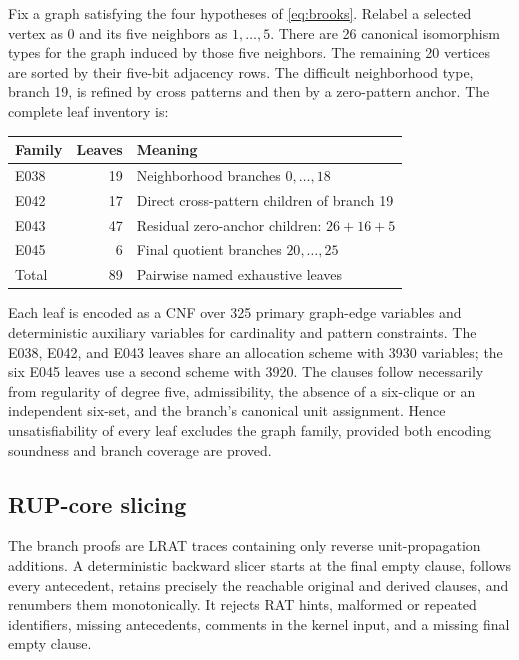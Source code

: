 \documentclass[11pt,reqno,a4paper]{amsart}
\theoremstyle{definition}
\theoremstyle{remark}
\begin{document}
Fix a graph satisfying the four hypotheses of
\eqref{eq:brooks}.  Relabel a selected vertex as 0 and its five neighbors as
\(1,\ldots,5\).  There are 26 canonical isomorphism types for the graph
induced by those five neighbors.  The remaining 20 vertices are sorted by
their five-bit adjacency rows.  The difficult neighborhood type, branch 19,
is refined by cross patterns and then by a zero-pattern anchor.  The
complete leaf inventory is:
\begin{center}
\begin{tabular}{@{}lrl@{}}
\toprule
Family & Leaves & Meaning\\
\midrule
E038 & 19 & Neighborhood branches \(0,\ldots,18\)\\
E042 & 17 & Direct cross-pattern children of branch 19\\
E043 & 47 & Residual zero-anchor children: \(26+16+5\)\\
E045 & 6 & Final quotient branches \(20,\ldots,25\)\\
\midrule
Total & 89 & Pairwise named exhaustive leaves\\
\bottomrule
\end{tabular}
\end{center}

Each leaf is encoded as a CNF over 325 primary graph-edge variables and
deterministic auxiliary variables for cardinality and pattern constraints.
The E038, E042, and E043 leaves share an allocation scheme with 3930
variables; the six E045 leaves use a second scheme with 3920.  The
clauses follow necessarily from regularity of degree five, admissibility,
the absence of a six-clique or an independent six-set, and the branch's
canonical unit assignment.  Hence unsatisfiability of every leaf excludes the
graph family, provided both encoding soundness and branch coverage are proved.

\subsection{RUP-core slicing}

The branch proofs are LRAT traces containing only reverse unit-propagation
additions.  A deterministic backward slicer starts at the final
empty clause, follows every antecedent, retains precisely the reachable
original and derived clauses, and renumbers them monotonically.  It rejects
RAT hints, malformed or repeated identifiers, missing antecedents, comments
in the kernel input, and a missing final empty clause.
\end{document}
